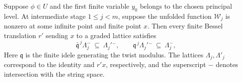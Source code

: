 \begin{lemma}
\label{lem:a-seesaw-lattice-support}
\emitthmsource
Suppose $\phi\in U$ and the first finite variable $y_0$ belongs to the chosen principal level. At intermediate stage $1\le j<m$, suppose the unfolded function $\mathcal W_j$ is nonzero at some infinite point and finite point $x$. Then every finite Bessel translation $r'$ sending $x$ to a graded lattice satisfies
\[
 \bar{\mathfrak q}^{\,j}\Lambda_j^{-}\ \subseteq\ \Lambda_j'{}^{-},
 \qquad
 {\mathfrak q}^{\,j}\Lambda_j'{}^{-}\ \subseteq\ \Lambda_j^{-},
\]
Here $\mathfrak q$ is the finite idele generating the twist modulus. The lattices $\Lambda_j,\Lambda'_j$ correspond to the identity and $r'x$, respectively, and the superscript $-$ denotes intersection with the string space.
\end{lemma}
